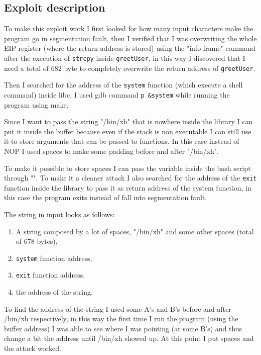\documentclass[a4paper,12pt]{article}
\begin{document}
\subsection{Exploit description} 

To make this exploit work I first looked for how many input characters make the program go in segmentation fault, then I verified that I was overwriting the whole EIP register (where the return address is stored) using the "info frame" command after the execution of \texttt{strcpy} inside \texttt{greetUser}, in this way I discovered that I need a total of 682 byte to completely overwrite the return address of \texttt{greetUser}.

Then I searched for the address of the \texttt{system} function (which execute a shell command) inside libc, I used gdb command \texttt{p \&system} while running the program using make.

Since I want to pass the string "/bin/xh" that is nowhere inside the library I can put it inside the buffer because even if the stack is non executable I can still use it to store arguments that can be passed to functions. In this case instead of NOP I used spaces to make some padding before and after "/bin/xh".

To make it possible to store spaces I can pass the variable inside the bash script through "". To make it a cleaner attack I also searched for the address of the \texttt{exit} function inside the library to pass it as return address of the system function, in this case the program exits instead of fall into segmentation fault.

The string in input looks as follows:
\begin{enumerate}
\item A string composed by a lot of spaces, "/bin/xh" and some other spaces (total of 678 bytes),
\item \texttt{system} function address,
\item \texttt{exit} function address,
\item the address of the string.
\end{enumerate}

To find the address of the string I used some A's and B's before and after /bin/xh respectively, in this way the first time I run the program (using the buffer address) I was able to see where I was pointing (at some B's) and thus change a bit the address until /bin/xh showed up. At this point I put spaces and the attack worked.
\end{document}
